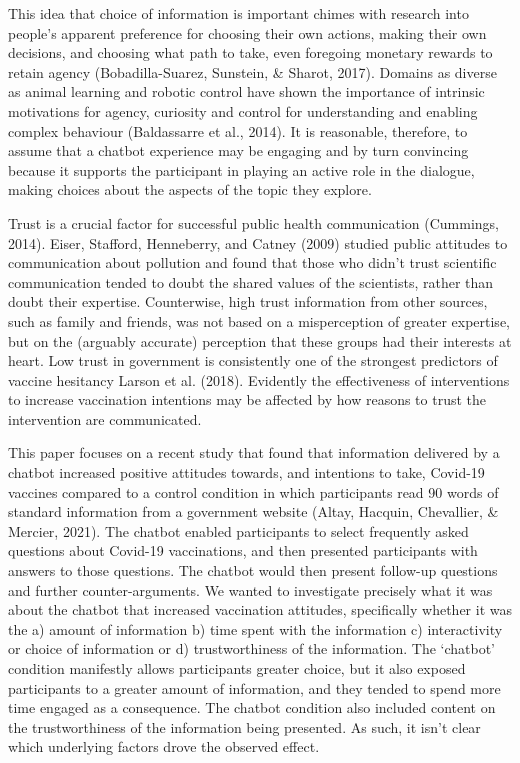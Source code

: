 \documentclass[
  english,
  ,jou,floatsintext]{apa6}
\begin{document}
This idea that choice of information is important chimes with research into people's apparent preference for choosing their own actions, making their own decisions, and choosing what path to take, even foregoing monetary rewards to retain agency (Bobadilla-Suarez, Sunstein, \& Sharot, 2017). Domains as diverse as animal learning and robotic control have shown the importance of intrinsic motivations for agency, curiosity and control for understanding and enabling complex behaviour (Baldassarre et al., 2014). It is reasonable, therefore, to assume that a chatbot experience may be engaging and by turn convincing because it supports the participant in playing an active role in the dialogue, making choices about the aspects of the topic they explore.

Trust is a crucial factor for successful public health communication (Cummings, 2014). Eiser, Stafford, Henneberry, and Catney (2009) studied public attitudes to communication about pollution and found that those who didn't trust scientific communication tended to doubt the shared values of the scientists, rather than doubt their expertise. Counterwise, high trust information from other sources, such as family and friends, was not based on a misperception of greater expertise, but on the (arguably accurate) perception that these groups had their interests at heart. Low trust in government is consistently one of the strongest predictors of vaccine hesitancy Larson et al. (2018). Evidently the effectiveness of interventions to increase vaccination intentions may be affected by how reasons to trust the intervention are communicated.

This paper focuses on a recent study that found that information delivered by a chatbot increased positive attitudes towards, and intentions to take, Covid-19 vaccines compared to a control condition in which participants read 90 words of standard information from a government website (Altay, Hacquin, Chevallier, \& Mercier, 2021). The chatbot enabled participants to select frequently asked questions about Covid-19 vaccinations, and then presented participants with answers to those questions. The chatbot would then present follow-up questions and further counter-arguments. We wanted to investigate precisely what it was about the chatbot that increased vaccination attitudes, specifically whether it was the a) amount of information b) time spent with the information c) interactivity or choice of information or d) trustworthiness of the information. The `chatbot' condition manifestly allows participants greater choice, but it also exposed participants to a greater amount of information, and they tended to spend more time engaged as a consequence. The chatbot condition also included content on the trustworthiness of the information being presented. As such, it isn't clear which underlying factors drove the observed effect.
\end{document}

